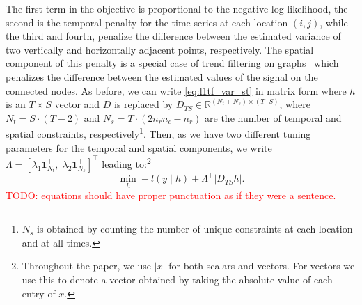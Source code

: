 \documentclass{article}
\newcommand{\attn}[1]{\textcolor{red}{TODO: #1}}
\newcommand{\one}{\mathbf{1}}
\newcommand{\given}{\;\vert\;}
\begin{document}
The first term in the objective is proportional to the negative
log-likelihood, the second is the temporal penalty for the
time-series at each location $(i,j)$, while the third and fourth,
penalize the difference between the estimated variance of two
vertically and horizontally adjacent points, respectively. The spatial
component of this
penalty is a special case of trend
filtering on graphs~\citep{WangSharpnack2016} which penalizes the difference
between the estimated values of the signal on the connected
nodes. As before, we can write
\eqref{eq:l1tf_var_st} in matrix form where $h$ is an $T\times
S$ vector and $D$ is replaced by $D_{TS} \in \mathbb{R}^{(N_t+N_s)
  \times (T \cdot S)	}$, where $N_t=S \cdot (T-2)$ and $N_s=T \cdot
(2n_rn_c-n_r)$ are the number of temporal and spatial constraints,
respectively\footnote{$N_s$ is obtained by counting the number of
  unique constraints at each location and at all times.}. Then, as we 
have two different tuning parameters for the temporal and spatial
components, we write $\Lambda =\left[\lambda_1\one_{N_t}^\top,\;
  \lambda_2\one_{N_s}^\top\right]^\top$ leading
to:\footnote{Throughout the paper, we use $|x|$ for both scalars and
  vectors. For vectors we use this to denote a vector obtained by
  taking the absolute value of each entry of $x$.} 
\begin{equation}
\min_h -l(y\given h)+ \Lambda^\top | D_{TS}h |.
\label{eq:l1tf_var_st_mat}
\end{equation}
\attn{equations should have proper punctuation as if they were a sentence.}
\end{document}
